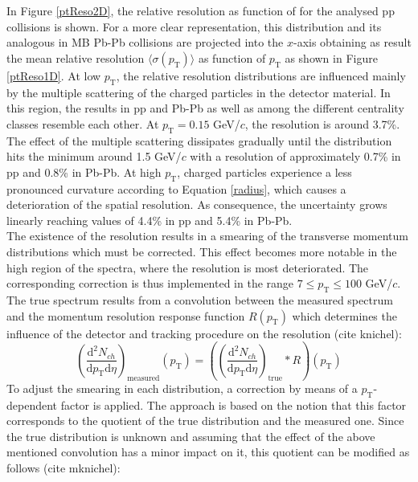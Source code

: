 \documentclass[12pt,a4paper]{report}
\begin{document}
In Figure \ref{ptReso2D}, the relative \pt resolution as function of \pt for the analysed pp collisions is shown. For a more clear representation, this distribution and its analogous in MB Pb-Pb collisions are projected into the $x$-axis obtaining as result the mean relative \pt resolution $\langle\sigma(p_\text{T})\rangle$ as function of $p_\text{T}$ as shown in Figure \ref{ptReso1D}. At low $p_\text{T}$, the relative \pt resolution distributions are influenced mainly by the multiple scattering of the charged particles in the detector material. In this region, the results in pp and Pb-Pb as well as among the different centrality classes resemble each other. At $p_\text{T} = 0.15$ GeV/$c$, the resolution is around 3.7\%. The effect of the multiple scattering dissipates gradually until the distribution hits the minimum around 1.5 GeV/$c$ with a \pt resolution of approximately 0.7\% in pp and 0.8\% in Pb-Pb. At high $p_\text{T}$, charged particles experience a less pronounced curvature according to Equation \ref{radius}, which causes a deterioration of the spatial resolution. As consequence, the uncertainty grows linearly reaching values of 4.4\% in pp and 5.4\% in Pb-Pb.\\
The existence of the \pt resolution results in a smearing of the transverse momentum distributions which must be corrected. This effect becomes more notable in the high \pt region of the \pt spectra, where the resolution is most deteriorated. The corresponding correction is thus implemented in the range $7 \leq p_\text{T} \leq 100$ GeV/$c$. The true \pt spectrum results from a convolution between the measured \pt spectrum and the momentum resolution response function $R(p_\text{T})$ which determines the influence of the detector and tracking procedure on the \pt resolution (cite knichel):
\begin{equation} 
  \left(\dfrac{\text{d}^2 N_{ch}}{\text{d}p_{\text{T}} \text{d}\eta} \right)_{\text{measured}} (p_{\text{T}}) = \left(\left(\dfrac{\text{d}^2 N_{ch}}{\text{d}p_{\text{T}} \text{d}\eta} \right)_{\text{true}} *R \right)(p_{\text{T}})
\end{equation}
To adjust the smearing in each \pt distribution, a correction by means of a $p_\text{T}$-dependent factor is applied. The approach is based on the notion that this factor corresponds to the quotient of the true \pt distribution and the measured one. Since the true \pt distribution is unknown and assuming that the effect of the above mentioned convolution has a minor impact on it, this quotient can be modified as follows (cite mknichel):
\end{document}
